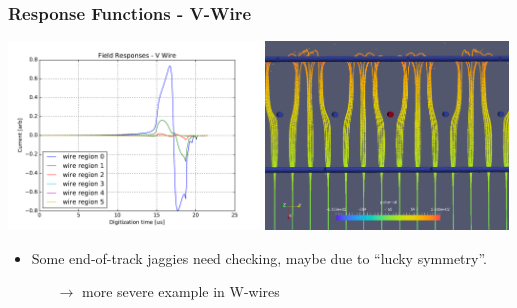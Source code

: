 \documentclass[xcolor=dvipsnames]{beamer}
\begin{document}
\begin{frame}
  \frametitle{Response Functions - V-Wire}
  \begin{center}
    \includegraphics[height=5cm,clip,trim=0cm 0cm 0 0cm]{steps/vcurrent-responses.pdf}%
    \includegraphics[height=5cm,clip,trim=0cm 0cm 0 0cm]{steps/vpaths-1.png}
  \end{center}
  \footnotesize 
  \begin{itemize}
  \item Some end-of-track jaggies need checking, maybe due to ``lucky symmetry''.
    \begin{itemize}
    \item[$\rightarrow$] more severe example in W-wires
    \end{itemize}
  \end{itemize}
\end{frame}
\end{document}
